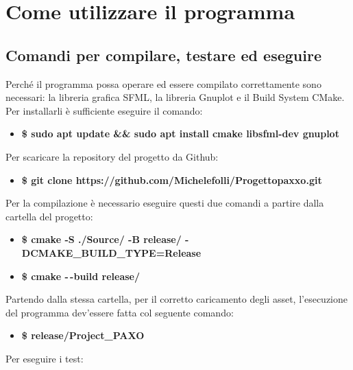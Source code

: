 \documentclass{article}
\begin{document}
\section{Come utilizzare il programma}

\subsection{Comandi per compilare, testare ed eseguire}

Perché il programma possa operare ed essere compilato correttamente sono 
necessari: la libreria grafica SFML, la libreria Gnuplot e il Build System 
CMake. Per installarli è sufficiente eseguire il comando:
\begin{itemize}
    \item \textbf{\$ sudo apt update \&\& sudo apt install cmake libsfml-dev 
    gnuplot}
\end{itemize}

\begin{flushleft}
    Per scaricare la repository del progetto da Github:
\end{flushleft}

\begin{itemize}
    \item \textbf{\$ git clone https://github.com/Michelefolli/Progettopaxxo.git}
\end{itemize}

\begin{flushleft}
Per la compilazione è necessario eseguire questi due comandi a partire dalla 
cartella del progetto:
\end{flushleft}

\begin{itemize}
    \item  \textbf{\$ cmake -S ./Source/ -B release/ -DCMAKE\_BUILD\_TYPE=Release}
    \item \textbf{\$ cmake -\,-build release/}
\end{itemize}

\begin{flushleft}
Partendo dalla stessa cartella, per il corretto caricamento degli asset, 
l'esecuzione del programma dev'essere fatta col seguente comando:
\end{flushleft}
\begin{itemize}
    \item \textbf{\$ release/Project\_PAXO}
\end{itemize}

\begin{flushleft}
    Per eseguire i test:
\end{flushleft}
\end{document}
